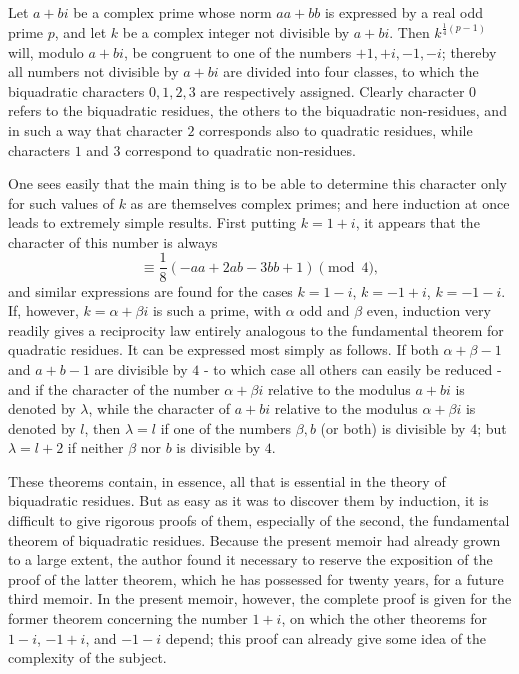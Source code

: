 \documentclass[12pt]{article}
\begin{document}
Let $a+bi$ be a complex prime whose norm $aa+bb$ is expressed by a real odd prime $p$, and let $k$ be a complex integer not divisible by $a+bi$. Then $k^{\frac14(p-1)}$ will, modulo $a+bi$, be congruent to one of the numbers $+1,+i,-1,-i$; thereby all numbers not divisible by $a+bi$ are divided into four classes, to which the biquadratic characters $0,1,2,3$ are respectively assigned. Clearly character $0$ refers to the biquadratic residues, the others to the biquadratic non-residues, and in such a way that character $2$ corresponds also to quadratic residues, while characters $1$ and $3$ correspond to quadratic non-residues.

One sees easily that the main thing is to be able to determine this character only for such values of $k$ as are themselves complex primes; and here induction at once leads to extremely simple results. First putting $k=1+i$, it appears that the character of this number is always
\[
\equiv \frac18(-aa+2ab-3bb+1)\pmod 4,
\]
and similar expressions are found for the cases $k=1-i$, $k=-1+i$, $k=-1-i$. If, however, $k=\alpha+\beta i$ is such a prime, with $\alpha$ odd and $\beta$ even, induction very readily gives a reciprocity law entirely analogous to the fundamental theorem for quadratic residues. It can be expressed most simply as follows. If both $\alpha+\beta-1$ and $a+b-1$ are divisible by $4$ - to which case all others can easily be reduced - and if the character of the number $\alpha+\beta i$ relative to the modulus $a+bi$ is denoted by $\lambda$, while the character of $a+bi$ relative to the modulus $\alpha+\beta i$ is denoted by $l$, then $\lambda=l$ if one of the numbers $\beta,b$ (or both) is divisible by $4$; but $\lambda=l+2$ if neither $\beta$ nor $b$ is divisible by $4$.

These theorems contain, in essence, all that is essential in the theory of biquadratic residues. But as easy as it was to discover them by induction, it is difficult to give rigorous proofs of them, especially of the second, the fundamental theorem of biquadratic residues. Because the present memoir had already grown to a large extent, the author found it necessary to reserve the exposition of the proof of the latter theorem, which he has possessed for twenty years, for a future third memoir. In the present memoir, however, the complete proof is given for the former theorem concerning the number $1+i$, on which the other theorems for $1-i$, $-1+i$, and $-1-i$ depend; this proof can already give some idea of the complexity of the subject.
\end{document}
